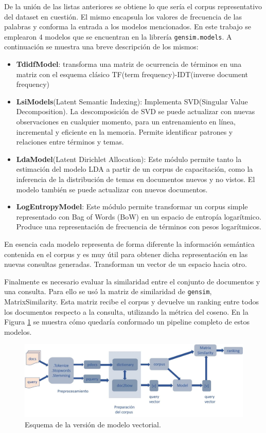 \documentclass{llncs}
\begin{document}
De la unión de las listas anteriores se obtiene lo que sería el corpus representativo del dataset en cuestión. 
El mismo encapsula los valores de frecuencia de las palabras y conforma la entrada a los modelos mencionados. En este trabajo se emplearon 4 modelos que se encuentran en la librería \texttt{gensim.models}. A continuación se muestra una breve descripción de los mismos:
\begin{itemize}
	\item \textbf{TdidfModel}: transforma una matriz de ocurrencia de términos en una matriz con el esquema clásico TF(term frequency)-IDT(inverse document frequency)
	\item \textbf{LsiModels}(Latent Semantic Indexing): Implementa SVD(Singular Value Decomposition). La descomposición de SVD se puede actualizar con nuevas observaciones en cualquier momento, para un entrenamiento en línea, incremental y eficiente en la memoria. Permite identificar patrones y relaciones entre términos y temas. 
	\item \textbf{LdaModel}(Latent Dirichlet Allocation): Este módulo permite tanto la estimación del modelo LDA a partir de un corpus de capacitación, como la inferencia de la distribución de temas en documentos nuevos y no vistos. El modelo también se puede actualizar con nuevos documentos.
	\item \textbf{LogEntropyModel}: Este módulo permite transformar un corpus simple representado con Bag of Words (BoW) en un espacio de entropía logarítmico. Produce una representación de frecuencia de términos con pesos logarítmicos.
	
\end{itemize}

	En esencia cada modelo representa de forma diferente la información semántica contenida en el corpus y es muy útil para obtener dicha representación en las nuevas consultas generadas. Transforman un vector de un espacio hacia otro.
	
Finalmente es necesario evaluar la similaridad entre el conjunto de documentos y una consulta. Para ello se usó la matriz de similaridad de \texttt{gensim}, MatrixSimilarity. Esta matriz recibe el corpus y devuelve un ranking entre todos los documentos respecto a la consulta, utilizando la métrica del coseno. En la Figura \ref{vect} se muestra cómo quedaría conformado un pipeline completo de estos modelos.


\begin{figure}
	\begin{center}
		\includegraphics[width=\linewidth]{ ./images/vect.jpg}
		\caption{Esquema de la versión de modelo vectorial.}
		\label{vect}
	\end{center}
\end{figure}
\end{document}
